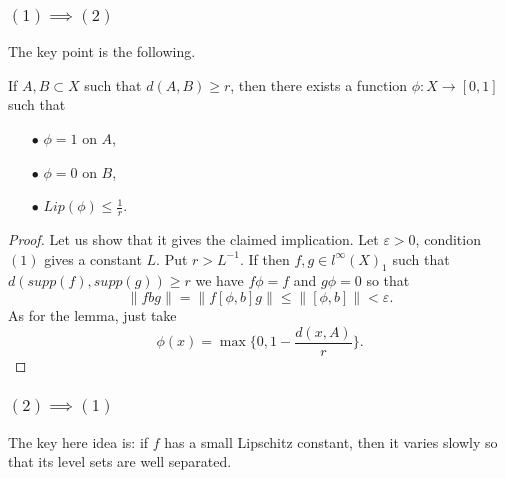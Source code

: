 \subsubsection*{$(1)\implies (2)$}
The key point is the following.

\begin{lem}
If $A,B\subset X$ such that $d(A,B)\geq r$, then there exists a function $\phi : X \rightarrow [0,1]$ such that 
\begin{itemize}
\item[$\bullet$] $\phi =1$ on $A$,
\item[$\bullet$] $\phi =0$ on $B$,
\item[$\bullet$] $Lip(\phi) \leq \frac{1}{r}$.
\end{itemize}
\end{lem} 
\begin{proof}
Let us show that it gives the claimed implication. Let $\varepsilon >0 $, condition $(1)$ gives a constant $L$. Put $r> L^{-1}$. If then $f,g\in l^\infty(X)_1$ such that $d(supp(f),supp(g))\geq r$ we have $f\phi=f$ and $g\phi=0$ so that 
\[\| fbg\| = \| f[\phi, b]g\| \leq \| [\phi,b]\| <\varepsilon .\]
As for the lemma, just take
\[\phi(x) = \max \{ 0, 1 -\frac{d(x,A)}{r}\}.\]
\end{proof}

\subsubsection*{$(2)\implies (1)$}
The key here idea is: if $f$ has a small Lipschitz constant, then it varies slowly so that its level sets are well separated.\\

